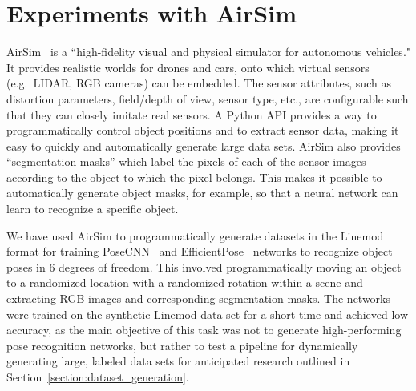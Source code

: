\section{Experiments with AirSim}

AirSim~\cite{airsim2017fsr} is a ``high-fidelity visual and physical simulator for autonomous vehicles."
It provides realistic worlds for drones and cars, onto which virtual sensors (e.g.~LIDAR, RGB cameras) can be embedded.
The sensor attributes, such as distortion parameters, field/depth of view, sensor type, etc.,
are configurable such that they can closely imitate real sensors.
A Python API provides a way to programmatically control object positions and to extract sensor data,
making it easy to quickly and automatically generate large data sets.
AirSim also provides ``segmentation masks'' which label the pixels of each of the sensor images according to the
object to which the pixel belongs.
This makes it possible to automatically generate object masks, for example, so that a neural network can learn
to recognize a specific object.

We have used AirSim to programmatically generate datasets in the Linemod format for training PoseCNN~\cite{posecnn}
and EfficientPose~\cite{efficientpose} networks to recognize object poses in 6 degrees of freedom.
This involved programmatically moving an object to a randomized location with a randomized rotation within a scene
and extracting RGB images and corresponding segmentation masks.
The networks were trained on the synthetic Linemod data set for a short time and achieved low accuracy,
as the main objective of this task was not to generate high-performing pose recognition networks,
but rather to test a pipeline for dynamically generating large, labeled data sets for anticipated
research outlined in Section~\ref{section:dataset_generation}.
